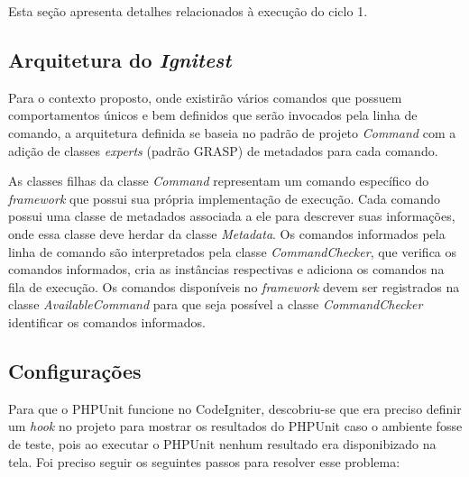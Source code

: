       Esta seção apresenta detalhes relacionados à execução do ciclo 1.
      
      \subsection{Arquitetura do \textit{Ignitest}}
      
	  Para o contexto proposto, onde existirão vários comandos que possuem comportamentos únicos e bem definidos que serão
	  invocados pela linha de comando, a arquitetura definida se baseia no padrão de projeto \textit{Command} \cite{gamma}
	  com a adição de classes \textit{experts} (padrão GRASP) de metadados para cada comando.
	  
	  As classes filhas da classe \textit{Command} representam um comando específico do \textit{framework} que possui sua 
	  própria implementação de execução. Cada comando possui uma classe de metadados associada a ele para descrever suas
	  informações, onde essa classe deve herdar da classe \textit{Metadata}. Os comandos informados pela linha de comando
	  são interpretados pela classe \textit{CommandChecker}, que verifica os comandos informados, cria as instâncias respectivas
	  e adiciona os comandos na fila de execução. Os comandos disponíveis no \textit{framework} devem ser registrados na classe
	  \textit{AvailableCommand} para que seja possível a classe \textit{CommandChecker} identificar os comandos informados.
      
      \subsection{Configurações}
	  
	  Para que o PHPUnit funcione no CodeIgniter, descobriu-se que era preciso definir um \textit{hook}\footnotemark
	  no projeto para mostrar os resultados do PHPUnit caso o ambiente fosse de teste, pois ao executar o PHPUnit nenhum
	  resultado era disponibizado na tela. Foi preciso seguir os seguintes passos para resolver esse problema:
	  
